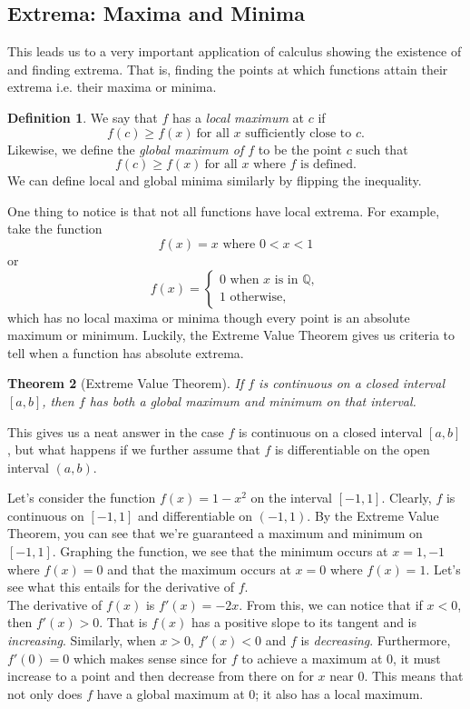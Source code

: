 \documentclass[12pt]{article}
\newcommand{\bbQ}{\mathbb{Q}}
\newtheorem{thm}{Theorem}[section]
\theoremstyle{definition}
\newtheorem{defn}[thm]{Definition}
\theoremstyle{plain}
\numberwithin{equation}{section}
\begin{document}
\subsection{Extrema: Maxima and Minima}

This leads us to a very important application of calculus showing the existence of and finding extrema. That is, finding the points at which functions attain their extrema i.e. their maxima or minima.

\begin{defn}
  We say that $f$ has a \emph{local maximum} at $c$ if
  \[
f(c)\geq f(x)\ \text{for all }x\text{ sufficiently close to } c.
  \]
Likewise, we define the \emph{global maximum of $f$} to be the point $c$ such that
\[
f(c)\geq f(x)\ \text{for all }x\text{ where $f$ is defined.}
\]
We can define local and global minima similarly by flipping the inequality.
\end{defn}

One thing to notice is that not all functions have local extrema. For example, take the function
\[
f(x)=x \text{ where } 0<x<1
\] or
\[
f(x)= \begin{cases}
0 \text{ when $x$ is in } \bbQ,  \\
1 \text{ otherwise},
\end{cases}
\] which has no local maxima or minima though every point is an absolute maximum or minimum. Luckily, the Extreme Value Theorem gives us criteria to tell when a function has absolute extrema.

\begin{thm}[Extreme Value Theorem]
  If $f$ is continuous on a closed interval $[a,b]$, then $f$ has both a global maximum and minimum on that interval.
\end{thm}

This gives us a neat answer in the case $f$ is continuous on a closed interval $[a,b]$, but what happens if we further assume that $f$ is differentiable on the open interval $(a,b)$.


Let's consider the function $f(x)=1-x^2$ on the interval $[-1,1]$. Clearly, $f$ is continuous on $[-1,1]$ and differentiable on $(-1,1)$. By the Extreme Value Theorem, you can see that we're guaranteed a maximum and minimum on $[-1,1]$. Graphing the function, we see that the minimum occurs at $x=1,-1$ where $f(x)=0$ and that the maximum occurs at $x=0$ where $f(x)=1$. Let's see what this entails for the derivative of $f$. \\


The derivative of $f(x)$ is $f'(x)=-2x$. From this, we can notice that if $x<0$, then $f'(x)>0$. That is $f(x)$ has a positive slope to its tangent and is \emph{increasing}. Similarly, when $x>0$, $f'(x)<0$ and $f$ is \emph{decreasing}.  Furthermore, $f'(0)=0$ which makes sense since for $f$ to achieve a maximum at 0, it must increase to a point and then decrease from there on for $x$ near 0. This means that not only does $f$ have a global maximum at 0; it also has a local maximum.
\end{document}
